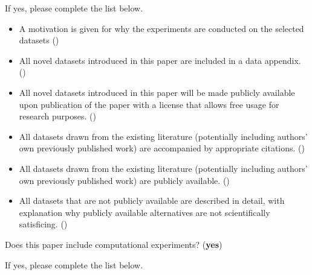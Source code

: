 If yes, please complete the list below.
\begin{itemize}
    \item A motivation is given for why the experiments are conducted on the selected datasets ()
    \item All novel datasets introduced in this paper are included in a data appendix. ()
    \item All novel datasets introduced in this paper will be made publicly available upon publication of the paper with a license that allows free usage for research purposes. ()
    \item All datasets drawn from the existing literature (potentially including authors’ own previously published work) are accompanied by appropriate citations. ()
    \item All datasets drawn from the existing literature (potentially including authors’ own previously published work) are publicly available. ()
    \item All datasets that are not publicly available are described in detail, with explanation why publicly available alternatives are not scientifically satisficing. ()
\end{itemize}

Does this paper include computational experiments? (\textbf{yes})

If yes, please complete the list below.

